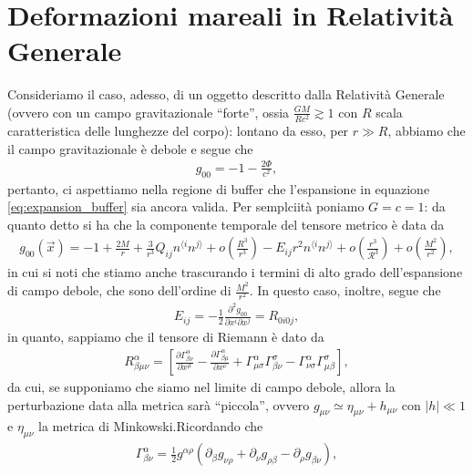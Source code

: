 \section{Deformazioni mareali in Relatività Generale}

Consideriamo il caso, adesso, di un oggetto descritto dalla Relatività Generale (ovvero con un campo gravitazionale ``forte'', ossia $\frac{GM}{Rc^2} \gtrsim 1$ con $R$ scala caratteristica delle lunghezze del corpo): lontano da esso, per $r \gg R$, abbiamo che il campo gravitazionale è debole e segue che
\begin{align}
	g_{00} = -1 - \frac{2 \Phi}{c^2},
\end{align}
pertanto, ci aspettiamo nella regione di buffer che l'espansione in equazione \eqref{eq:expansion_buffer} sia ancora valida. Per semplciità poniamo $G=c=1$: da quanto detto si ha che la componente temporale del tensore metrico è data da
\begin{align}
	g_{00}(\vec{x}) = -1 + \frac{2M}{r} + \frac{3}{r^3} Q_{ij} n^{\langle i} n^{j \rangle} + o \left( \frac{R^3}{r^3} \right) - E_{ij} r^2 n^{\langle i} n^{j \rangle} + o \left( \frac{r^3}{\mathcal{R}^3} \right) + o \left( \frac{M^2}{r^2} \right),
\end{align}
in cui si noti che stiamo anche trascurando i termini di alto grado dell'espansione di campo debole, che sono dell'ordine di $\frac{M^2}{r^2}$. In questo caso, inoltre, segue che
\begin{align} \label{eq:tidial_gr}
	E_{ij} = -\frac{1}{2} \frac{\partial^2 g_{00}}{\partial x^i \partial x^j} = R_{0i0j},
\end{align}
in quanto, sappiamo che il tensore di Riemann è dato da
\begin{align}
	R^\alpha_{\beta \mu \nu} = \left[ \frac{\partial \Gamma^\alpha_{\beta \nu}}{\partial x^\mu} - \frac{\partial \Gamma^\alpha_{\beta \mu}}{\partial x^\nu} + \Gamma^\alpha_{\mu \sigma} \Gamma^{\sigma}_{\beta \nu} - \Gamma^\alpha_{\nu \sigma} \Gamma^{\sigma}_{\mu \beta} \right],
\end{align}
da cui, se supponiamo che siamo nel limite di campo debole, allora la perturbazione data alla metrica sarà ``piccola'', ovvero $g_{\mu \nu} \simeq \eta_{\mu \nu}+h_{\mu \nu}$ con $|h| \ll 1$ e $\eta_{\mu \nu}$ la metrica di Minkowski.Ricordando che
\begin{align}
	\Gamma^{\alpha}_{\beta \nu} = \frac{1}{2} g^{\alpha \rho} \left(\partial_\beta g_{\nu \rho} + \partial_\nu g_{\rho \beta} - \partial_\rho g_{\beta \nu} \right),  
\end{align}
